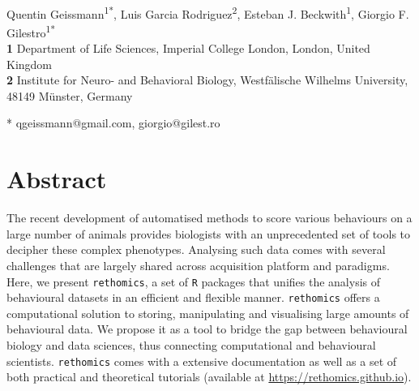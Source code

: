 \documentclass[10pt,letterpaper]{article}\usepackage[]{graphicx}\usepackage[]{color}
\date{}
\begin{document}
\vspace*{0.2in}

\begin{flushleft}
{\Large
\textbf{} 
}
\newline
\\
Quentin Geissmann\textsuperscript{1*},
Luis Garcia Rodriguez\textsuperscript{2},
Esteban J. Beckwith\textsuperscript{1},
Giorgio F. Gilestro\textsuperscript{1*}
\\
\bigskip
\textbf{1} Department of Life Sciences, Imperial College London, London, United Kingdom
\\
\textbf{2} Institute for Neuro- and Behavioral Biology, Westf{\"a}lische Wilhelms University, 48149 M{\"u}nster, Germany
\\
\bigskip


* qgeissmann@gmail.com, giorgio@gilest.ro

\end{flushleft}
\section*{Abstract}
The recent development of automatised methods to score various behaviours on a large number of animals
provides biologists with an unprecedented set of tools to decipher these complex phenotypes. 
Analysing such data comes with several challenges that are largely shared across acquisition platform and paradigms.
Here, we present \texttt{rethomics}, a set of \texttt{R} packages that unifies the analysis of behavioural datasets in an efficient and flexible manner.
\texttt{rethomics} offers a computational solution to storing, manipulating and visualising large amounts of behavioural data.
We propose it as a tool to bridge the gap between behavioural biology and data sciences, thus connecting computational and behavioural scientists.
\texttt{rethomics} comes with a extensive documentation as well as a set of both practical and theoretical tutorials (available at \href{https://rethomics.github.io}{https://rethomics.github.io}).
\end{document}
